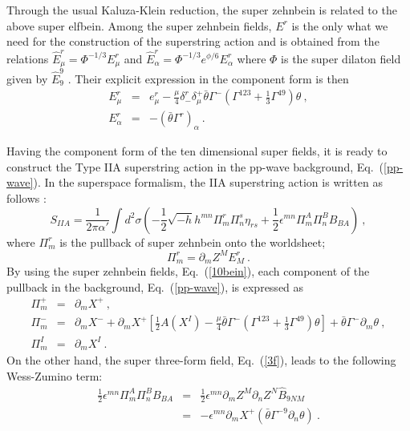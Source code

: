 \documentclass[a4paper,12pt]{article}
\begin{document}
Through the usual Kaluza-Klein reduction, the super zehnbein is
related to the above super elfbein.  Among the super zehnbein fields,
$E^r$ is the only what we need for the construction of the superstring
action and is obtained from the relations $\hat{E}^r_\mu = \Phi^{-1/3}
E^r_\mu$ and $\hat{E}^r_\alpha = \Phi^{-1/3} e^{\phi/6} E^r_\alpha$
where $\Phi$ is the super dilaton field given by
$\hat{E}^9_9$ \cite{cve202}.  Their explicit expression in the 
component form is then
\begin{eqnarray}
E^r_\mu &=& e^r_\mu - \frac{\mu}{4} \delta^r_- \delta_\mu^+ 
        \bar{\theta} \Gamma^- \left( \Gamma^{123} 
          + \frac{1}{3} \Gamma^{49} \right) \theta ~,
                                \nonumber \\
E^r_\alpha &=& - (\bar{\theta} \Gamma^r)_\alpha ~.
\label{10bein}
\end{eqnarray}

Having the component form of the ten dimensional super fields, it is
ready to construct the Type IIA superstring action in the pp-wave
background, Eq.~(\ref{pp-wave}).  In the superspace formalism, the IIA
superstring action is written as follows \cite{duf70}:
\begin{equation}
S_{IIA} = \frac{1}{2\pi \alpha'} \int d^2 \sigma
 \left( - \frac{1}{2} \sqrt{-h} h^{mn} \Pi_m^r \Pi_n^s \eta_{rs}
        + \frac{1}{2} \epsilon^{mn} \Pi_m^A \Pi_n^B B_{BA}
 \right)~,
\label{superIIA}
\end{equation}
where $\Pi^r_m$ is the pullback of super zehnbein onto the worldsheet;
\[
\Pi^r_m = \partial_m Z^M E^r_M~.
\]
By using the super zehnbein fields, Eq.~(\ref{10bein}), each
component of the pullback in the background, Eq.~(\ref{pp-wave}), is
expressed as
\begin{eqnarray}
\Pi^+_m &=& \partial_m X^+ ~,   \nonumber \\
\Pi^-_m &=& \partial_m X^- 
      + \partial_m X^+ 
      \left[ \frac{1}{2} A(X^I) - \frac{\mu}{4}
              \bar{\theta} \Gamma^- 
                 \left( \Gamma^{123} + \frac{1}{3}
               \Gamma^{49} \right) \theta 
      \right] 
      + \bar{\theta} \Gamma^- \partial_m \theta ~,
                           \nonumber \\
\Pi^I_m &=& \partial_m X^I ~.
\label{pullb}
\end{eqnarray}
On the other hand, the super three-form field, Eq.~(\ref{3f}), leads
to the following Wess-Zumino term:
\begin{eqnarray}
\frac{1}{2} \epsilon^{mn} \Pi^A_m \Pi^B_n B_{BA}
  &=& \frac{1}{2} \epsilon^{mn} \partial_m Z^M \partial_n Z^N
      \hat{B}_{9NM}      \nonumber \\
  &=& - \epsilon^{mn} \partial_m X^+ 
       (\bar{\theta} \Gamma^{-9} \partial_n \theta)~.
\label{wzt}
\end{eqnarray}
\end{document}
